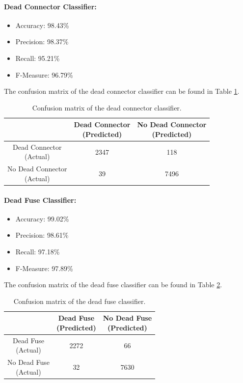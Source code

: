 \paragraph{Dead Connector Classifier:}
\begin{itemize}
  \item Accuracy: 98.43\%
  \item Precision: 98.37\%
  \item Recall: 95.21\%
  \item F-Measure: 96.79\%
\end{itemize}
The confusion matrix of the dead connector classifier can be found in
Table \ref{tbl:confusion-connector}.
\begin{table}[h]
  \centering
  \renewcommand\theadfont{\bfseries}
  \begin{tabular}{|c|c|c|}
    \hline
    & \thead{Dead Connector\\(Predicted)} & \thead{No Dead Connector\\(Predicted)} \\
    \hline
    \thead{Dead Connector\\(Actual)} & 2347 & 118 \\
    \hline
    \thead{No Dead Connector\\(Actual)} & 39 & 7496 \\
    \hline
  \end{tabular}
  \caption{Confusion matrix of the dead connector classifier.}
  \label{tbl:confusion-connector}
\end{table}

\paragraph{Dead Fuse Classifier:}
\begin{itemize}
  \item Accuracy: 99.02\%
  \item Precision: 98.61\%
  \item Recall: 97.18\%
  \item F-Measure: 97.89\%
\end{itemize}
The confusion matrix of the dead fuse classifier can be found in Table
\ref{tbl:confusion-fuse}.
\begin{table}[h]
  \centering
  \renewcommand\theadfont{\bfseries}
  \begin{tabular}{|c|c|c|}
    \hline
    & \thead{Dead Fuse\\(Predicted)} & \thead{No Dead Fuse\\(Predicted)} \\
    \hline
    \thead{Dead Fuse\\(Actual)} & 2272 & 66\\
    \hline
    \thead{No Dead Fuse\\(Actual)} & 32 & 7630\\
    \hline
  \end{tabular}
  \caption{Confusion matrix of the dead fuse classifier.}
  \label{tbl:confusion-fuse}
\end{table}

